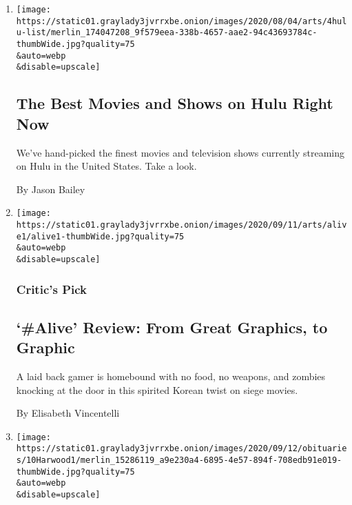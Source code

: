 \begin{enumerate}
\def\labelenumi{\arabic{enumi}.}
\item
  \href{/article/best-movies-shows-hulu.html}{}

  \texttt{[image: https://static01.graylady3jvrrxbe.onion/images/2020/08/04/arts/4hulu-list/merlin\_174047208\_9f579eea-338b-4657-aae2-94c43693784c-thumbWide.jpg?quality=75\\\&auto=webp\\\&disable=upscale]}

  \hypertarget{the-best-movies-and-shows-on-hulu-right-now}{%
  \subsection{The Best Movies and Shows on Hulu Right
  Now}\label{the-best-movies-and-shows-on-hulu-right-now}}

  We've hand-picked the finest movies and television shows currently
  streaming on Hulu in the United States. Take a look.

  By Jason Bailey
\item
  \href{/2020/09/11/movies/alive-review.html}{}

  \texttt{[image: https://static01.graylady3jvrrxbe.onion/images/2020/09/11/arts/alive1/alive1-thumbWide.jpg?quality=75\\\&auto=webp\\\&disable=upscale]}

  \hypertarget{critics-pick-1}{%
  \subsubsection{Critic's Pick}\label{critics-pick-1}}

  \hypertarget{alive-review-from-great-graphics-to-graphic}{%
  \subsection{`\#Alive' Review: From Great Graphics, to
  Graphic}\label{alive-review-from-great-graphics-to-graphic}}

  A laid back gamer is homebound with no food, no weapons, and zombies
  knocking at the door in this spirited Korean twist on siege movies.

  By Elisabeth Vincentelli
\item
  \href{/2020/09/10/movies/ronald-harwood-dead.html}{}

  \texttt{[image: https://static01.graylady3jvrrxbe.onion/images/2020/09/12/obituaries/10Harwood1/merlin\_15286119\_a9e230a4-6895-4e57-894f-708edb91e019-thumbWide.jpg?quality=75\\\&auto=webp\\\&disable=upscale]}


\end{enumerate}
